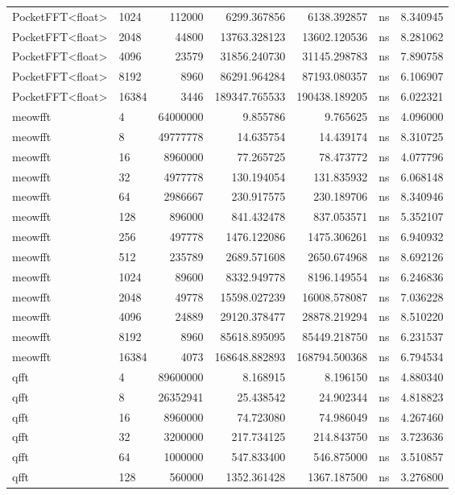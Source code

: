 \begin{tabular}{llrrrlr}
PocketFFT<float> & 1024 & 112000 & 6299.367856 & 6138.392857 & ns & 8.340945 \\
PocketFFT<float> & 2048 & 44800 & 13763.328123 & 13602.120536 & ns & 8.281062 \\
PocketFFT<float> & 4096 & 23579 & 31856.240730 & 31145.298783 & ns & 7.890758 \\
PocketFFT<float> & 8192 & 8960 & 86291.964284 & 87193.080357 & ns & 6.106907 \\
PocketFFT<float> & 16384 & 3446 & 189347.765533 & 190438.189205 & ns & 6.022321 \\
meowfft & 4 & 64000000 & 9.855786 & 9.765625 & ns & 4.096000 \\
meowfft & 8 & 49777778 & 14.635754 & 14.439174 & ns & 8.310725 \\
meowfft & 16 & 8960000 & 77.265725 & 78.473772 & ns & 4.077796 \\
meowfft & 32 & 4977778 & 130.194054 & 131.835932 & ns & 6.068148 \\
meowfft & 64 & 2986667 & 230.917575 & 230.189706 & ns & 8.340946 \\
meowfft & 128 & 896000 & 841.432478 & 837.053571 & ns & 5.352107 \\
meowfft & 256 & 497778 & 1476.122086 & 1475.306261 & ns & 6.940932 \\
meowfft & 512 & 235789 & 2689.571608 & 2650.674968 & ns & 8.692126 \\
meowfft & 1024 & 89600 & 8332.949778 & 8196.149554 & ns & 6.246836 \\
meowfft & 2048 & 49778 & 15598.027239 & 16008.578087 & ns & 7.036228 \\
meowfft & 4096 & 24889 & 29120.378477 & 28878.219294 & ns & 8.510220 \\
meowfft & 8192 & 8960 & 85618.895095 & 85449.218750 & ns & 6.231537 \\
meowfft & 16384 & 4073 & 168648.882893 & 168794.500368 & ns & 6.794534 \\
qfft & 4 & 89600000 & 8.168915 & 8.196150 & ns & 4.880340 \\
qfft & 8 & 26352941 & 25.438542 & 24.902344 & ns & 4.818823 \\
qfft & 16 & 8960000 & 74.723080 & 74.986049 & ns & 4.267460 \\
qfft & 32 & 3200000 & 217.734125 & 214.843750 & ns & 3.723636 \\
qfft & 64 & 1000000 & 547.833400 & 546.875000 & ns & 3.510857 \\
qfft & 128 & 560000 & 1352.361428 & 1367.187500 & ns & 3.276800 \\

\end{tabular}
